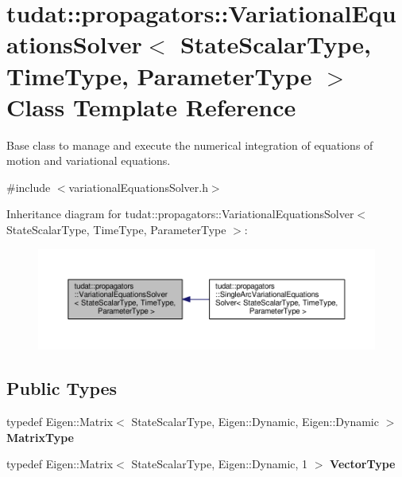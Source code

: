 \hypertarget{classtudat_1_1propagators_1_1VariationalEquationsSolver}{}\section{tudat\+:\+:propagators\+:\+:Variational\+Equations\+Solver$<$ State\+Scalar\+Type, Time\+Type, Parameter\+Type $>$ Class Template Reference}
\label{classtudat_1_1propagators_1_1VariationalEquationsSolver}


Base class to manage and execute the numerical integration of equations of motion and variational equations.  




{\ttfamily \#include $<$variational\+Equations\+Solver.\+h$>$}



Inheritance diagram for tudat\+:\+:propagators\+:\+:Variational\+Equations\+Solver$<$ State\+Scalar\+Type, Time\+Type, Parameter\+Type $>$\+:
\nopagebreak
\begin{figure}[H]
\begin{center}
\leavevmode
\includegraphics[width=350pt]{classtudat_1_1propagators_1_1VariationalEquationsSolver__inherit__graph}
\end{center}
\end{figure}
\subsection*{Public Types}
\begin{DoxyCompactItemize}
\item 
typedef Eigen\+::\+Matrix$<$ State\+Scalar\+Type, Eigen\+::\+Dynamic, Eigen\+::\+Dynamic $>$ {\bfseries Matrix\+Type}\hypertarget{classtudat_1_1propagators_1_1VariationalEquationsSolver_ad4639e1aad6a3e6b811769f9d1c51feb}{}\label{classtudat_1_1propagators_1_1VariationalEquationsSolver_ad4639e1aad6a3e6b811769f9d1c51feb}

\item 
typedef Eigen\+::\+Matrix$<$ State\+Scalar\+Type, Eigen\+::\+Dynamic, 1 $>$ {\bfseries Vector\+Type}\hypertarget{classtudat_1_1propagators_1_1VariationalEquationsSolver_a95c5bdd319fc92458c5eda3e5a4906c0}{}\label{classtudat_1_1propagators_1_1VariationalEquationsSolver_a95c5bdd319fc92458c5eda3e5a4906c0}

\end{DoxyCompactItemize}

